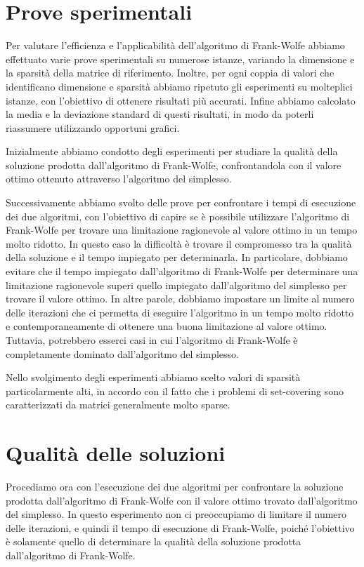 \section{Prove sperimentali}
Per valutare l'efficienza e l'applicabilità dell'algoritmo di Frank-Wolfe abbiamo effettuato varie prove sperimentali su
numerose istanze, variando la dimensione e la sparsità della matrice di riferimento. Inoltre, per ogni coppia di valori
che identificano dimensione e sparsità abbiamo ripetuto gli esperimenti su molteplici istanze, con l'obiettivo di
ottenere risultati più accurati. Infine abbiamo calcolato la media e la deviazione standard di questi risultati, in modo
da poterli riassumere utilizzando opportuni grafici.

Inizialmente abbiamo condotto degli esperimenti per studiare la qualità della soluzione prodotta dall'algoritmo di
Frank-Wolfe, confrontandola con il valore ottimo ottenuto attraverso l'algoritmo del simplesso.

Successivamente abbiamo svolto delle prove per confrontare i tempi di esecuzione dei due algoritmi, con l'obiettivo di
capire se è possibile utilizzare l'algoritmo di Frank-Wolfe per trovare una limitazione ragionevole al valore ottimo in
un tempo molto ridotto. In questo caso la difficoltà è trovare il compromesso tra la qualità della soluzione e il tempo
impiegato per determinarla. In particolare, dobbiamo evitare che il tempo impiegato dall'algoritmo di Frank-Wolfe per
determinare una limitazione ragionevole superi quello impiegato dall'algoritmo del simplesso per trovare il valore
ottimo. In altre parole, dobbiamo impostare un limite al numero delle iterazioni che ci permetta di eseguire l'algoritmo
in un tempo molto ridotto e contemporaneamente di ottenere una buona limitazione al valore ottimo. Tuttavia, potrebbero
esserci casi in cui l'algoritmo di Frank-Wolfe è completamente dominato dall'algoritmo del simplesso.

Nello svolgimento degli esperimenti abbiamo scelto valori di sparsità particolarmente alti, in accordo con il fatto che
i problemi di set-covering sono caratterizzati da matrici generalmente molto sparse.

\section{Qualità delle soluzioni}
Procediamo ora con l'esecuzione dei due algoritmi per confrontare la soluzione prodotta dall'algoritmo di Frank-Wolfe
con il valore ottimo trovato dall'algoritmo del simplesso. In questo esperimento non ci preoccupiamo di
limitare il numero delle iterazioni, e quindi il tempo di esecuzione di Frank-Wolfe, poiché l'obiettivo è solamente quello
di determinare la qualità della soluzione prodotta dall'algoritmo di Frank-Wolfe.


